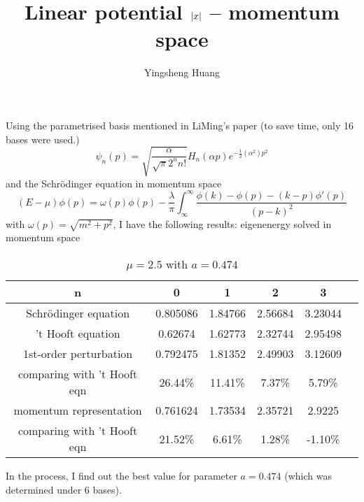 \documentclass{article}
\title{Linear potential $\abs{x}$ -- momentum space}
\author{Yingsheng Huang}
\begin{document}
\maketitle
Using the parametrised basis mentioned in LiMing's paper (to save time, only 16 bases were used.)
\begin{equation}
  \psi_n(p)= \sqrt{\frac{\alpha }{\sqrt{\pi } 2^n n!}} H_n(\alpha  p)e^{-\frac{1}{2} \left(\alpha ^2\right) p^2}
\end{equation}
and the Schr\"odinger equation in momentum space
\begin{equation}
  (E-\mu)\phi(p)=\omega (p) \phi(p)-\frac{\lambda  }{\pi }\int_{\infty}^{\infty}\frac{\phi (k)-\phi (p)-(k-p) \phi '(p)}{(p-k)^2}
\end{equation}
with $\omega(p)=\sqrt{m^2+p^2}$,
I have the following results: eigenenergy solved in momentum space
\begin{table}[H]
  \centering
  \begin{tabular}{|c|c|c|c|c|c|}
    \hline
    n & 0 & 1 & 2 & 3 \\\hline
    Schr\"odinger equation&0.805086&1.84766&2.56684&3.23044\\\hline
    't Hooft equation& 0.62674 & 1.62773 & 2.32744 & 2.95498 \\\hline
    1st-order perturbation&0.792475&1.81352&2.49903&3.12609\\\hline
    {\color{red}{error}} comparing with 't Hooft eqn&26.44\%&11.41\%&7.37\%&5.79\%\\\hline
    momentum representation &0.761624&1.73534&2.35721&2.9225\\\hline
    {\color{red}{error}} comparing with 't Hooft eqn&21.52\%&6.61\%&1.28\%&-1.10\%\\\hline
  \end{tabular}
  \caption{$\mu=2.5$ with $a=0.474$}
\end{table}

In the process, I find out the best value for parameter $a=0.474$ (which was determined under 6 bases).
\end{document}
